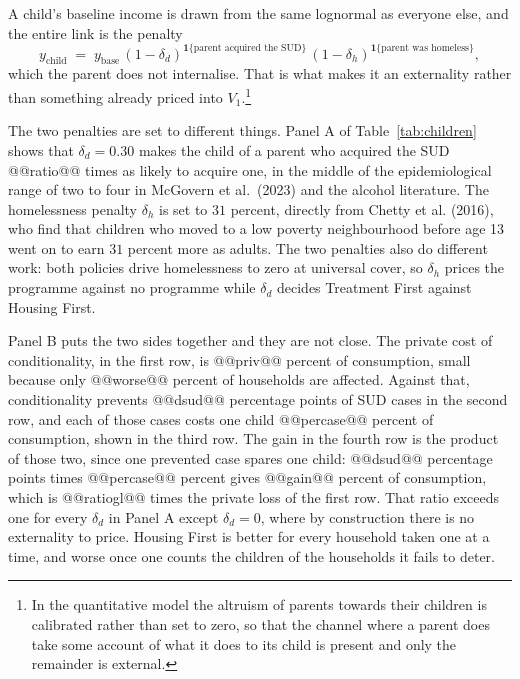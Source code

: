 \documentclass[10pt]{article}
\begin{document}
A child's baseline income is drawn from the same lognormal as everyone else, and
the entire link is the penalty
\begin{equation}\label{eq:kids}
y_{\text{child}} \;=\; y_{\text{base}}\,
(1-\delta_d)^{\mathbf{1}\{\text{parent acquired the SUD}\}}\,
(1-\delta_h)^{\mathbf{1}\{\text{parent was homeless}\}} ,
\end{equation}
which the parent does not internalise. That is what makes it an externality
rather than something already priced into $V_1$.\footnote{In the quantitative
model the altruism of parents towards their children is calibrated rather than
set to zero, so that the channel where a parent does take some account of what it
does to its child is present and only the remainder is external.}

The two penalties are set to different things. Panel A of
Table~\ref{tab:children} shows that $\delta_d = 0.30$ makes the child of a
parent who acquired the SUD @@ratio@@ times as likely to acquire one, in
the middle of the epidemiological range of two to four in McGovern et al.\
(2023) and the alcohol literature. The homelessness penalty $\delta_h$ is set
to $31$ percent, directly from Chetty et al. (2016), who find
that children who moved to a low poverty neighbourhood before age 13 went on to
earn $31$ percent more as adults. The two penalties also do different work: both policies drive
homelessness to zero at universal cover, so $\delta_h$ prices the programme
against no programme while $\delta_d$ decides Treatment First against Housing
First.


Panel B puts the two sides together and they are not close. The private cost of
conditionality, in the first row, is @@priv@@ percent of consumption, small
because only @@worse@@ percent of households are affected. Against that,
conditionality prevents @@dsud@@ percentage points of SUD cases in the
second row, and each of those cases costs one child @@percase@@ percent of
consumption, shown in the third row. The gain in the fourth row is the
product of those two, since one prevented case spares one child: @@dsud@@
percentage points times @@percase@@ percent gives @@gain@@ percent of
consumption, which is @@ratiogl@@ times the private loss of the first row.
That ratio exceeds one for every $\delta_d$ in Panel A except $\delta_d=0$, where
by construction there is no externality to price. Housing
First is better for every household taken one at a time, and worse once one
counts the children of the households it fails to deter.
\end{document}
